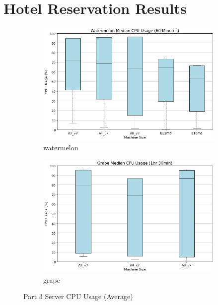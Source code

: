 \section{Hotel Reservation Results }
\begin{figure}[H]
     \centering
     \begin{subfigure}[b]{0.49\textwidth}
         \centering
         \includegraphics[width=\textwidth]{images/watermelon_cpu.png}
         \caption{watermelon}
         \label{fig:watermelon_cpu}
     \end{subfigure}
     \hfill
     \begin{subfigure}[b]{0.49\textwidth}
         \centering
         \includegraphics[width=\textwidth]{images/grape_cpu.png}
         \caption{grape}
         \label{fig:grape_cpu}
     \end{subfigure}
    
        \caption{Part 3 Server CPU Usage (Average)}
        \label{fig:part_3_cpu}
\end{figure}
